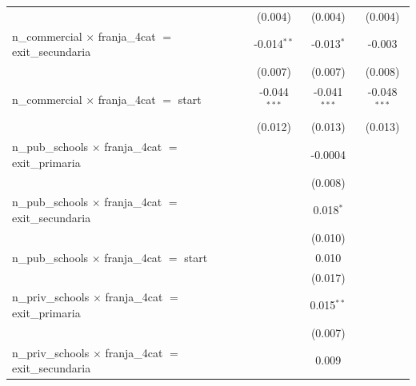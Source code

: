 \begin{tabular}{lccc}
                                                                                               & (0.004)        & (0.004)               & (0.004)\\   
   n\_commercial $\times$ franja\_4cat $=$ exit\_secundaria                                    & -0.014$^{**}$  & -0.013$^{*}$          & -0.003\\   
                                                                                               & (0.007)        & (0.007)               & (0.008)\\   
   n\_commercial $\times$ franja\_4cat $=$ start                                               & -0.044$^{***}$ & -0.041$^{***}$        & -0.048$^{***}$\\   
                                                                                               & (0.012)        & (0.013)               & (0.013)\\   
   n\_pub\_schools $\times$ franja\_4cat $=$ exit\_primaria                                    &                & -0.0004               &   \\   
                                                                                               &                & (0.008)               &   \\   
   n\_pub\_schools $\times$ franja\_4cat $=$ exit\_secundaria                                  &                & 0.018$^{*}$           &   \\   
                                                                                               &                & (0.010)               &   \\   
   n\_pub\_schools $\times$ franja\_4cat $=$ start                                             &                & 0.010                 &   \\   
                                                                                               &                & (0.017)               &   \\   
   n\_priv\_schools $\times$ franja\_4cat $=$ exit\_primaria                                   &                & 0.015$^{**}$          &   \\   
                                                                                               &                & (0.007)               &   \\   
   n\_priv\_schools $\times$ franja\_4cat $=$ exit\_secundaria                                 &                & 0.009                 &   \\   

\end{tabular}

